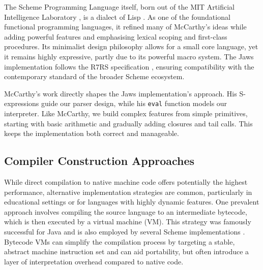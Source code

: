 \documentclass[final]{cmpreport_02}
\begin{document}
The Scheme Programming Language itself, born out of the MIT Artificial Intelligence Laboratory \cite{SchemeInterpMIT}, is a dialect of Lisp \cite{structureandinterp}. As one of the foundational functional programming languages, it refined many of McCarthy's ideas while adding powerful features and emphasising lexical scoping and first-class procedures. Its minimalist design philosophy allows for a small core language, yet it remains highly expressive, partly due to its powerful macro system. The Jaws implementation follows the R7RS specification \cite{r7rs}, ensuring compatibility with the contemporary standard of the broader Scheme ecosystem.\newline

McCarthy's work directly shapes the Jaws implementation's approach. His S-expressions guide our parser design, while his \texttt{eval} function models our interpreter. Like McCarthy, we build complex features from simple primitives, starting with basic arithmetic and gradually adding closures and tail calls. This keeps the implementation both correct and manageable.

\subsection{Compiler Construction Approaches}

While direct compilation to native machine code offers potentially the highest performance, alternative implementation strategies are common, particularly in educational settings or for languages with highly dynamic features. One prevalent approach involves compiling the source language to an intermediate bytecode, which is then executed by a virtual machine (VM). This strategy was famously successful for Java \cite{oracle2024java} and is also employed by several Scheme implementations \cite{SchemeImplementations}. Bytecode VMs can simplify the compilation process by targeting a stable, abstract machine instruction set and can aid portability, but often introduce a layer of interpretation overhead compared to native code.\newline
\end{document}
